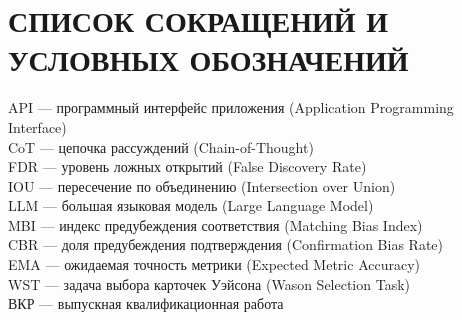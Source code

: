 \chapter*{СПИСОК СОКРАЩЕНИЙ И УСЛОВНЫХ ОБОЗНАЧЕНИЙ}
\setlength{\parindent}{0pt}
API --- программный интерфейс приложения (Application Programming Interface)\\[0.5em]
CoT --- цепочка рассуждений (Chain-of-Thought)\\[0.5em]
FDR --- уровень ложных открытий (False Discovery Rate)\\[0.5em]
IOU --- пересечение по объединению (Intersection over Union)\\[0.5em]
LLM --- большая языковая модель (Large Language Model)\\[0.5em]
MBI --- индекс предубеждения соответствия (Matching Bias Index)\\[0.5em]
CBR --- доля предубеждения подтверждения (Confirmation Bias Rate)\\[0.5em]
EMA --- ожидаемая точность метрики (Expected Metric Accuracy)\\[0.5em]
WST --- задача выбора карточек Уэйсона (Wason Selection Task)\\[0.5em]
ВКР --- выпускная квалификационная работа